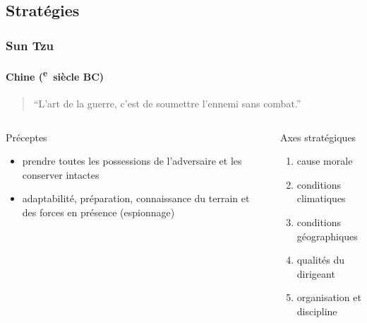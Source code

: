 \documentclass[utf8,hyperref={pagebackref}]{beamer}
\newcommand{\cRM}[1]{\MakeUppercase{\romannumeral #1}}  %
\newcommand{\siecle}[1]{\cRM{#1}\textsuperscript{e}~siècle}
\begin{document}
\subsection{Stratégies}

\begin{frame}
\frametitle{Sun Tzu}
\framesubtitle{Chine (\siecle{6} BC)}
\begin{quote}“L'art de la guerre, c'est de soumettre l'ennemi sans combat.”\end{quote}
\vfill
\begin{columns}[t]
\begin{column}{0.5\linewidth}
Préceptes
\begin{itemize}
\item prendre toutes les possessions de l'adversaire et les conserver intactes
\item adaptabilité, préparation, connaissance du terrain et des forces en présence (espionnage)
\end{itemize}
\end{column}
\begin{column}{0.5\linewidth}
Axes stratégiques
\begin{enumerate}
\item cause morale
\item conditions climatiques
\item conditions géographiques
\item qualités du dirigeant
\item organisation et discipline
\end{enumerate}
\end{column}
\end{columns}

\end{frame}
\end{document}
